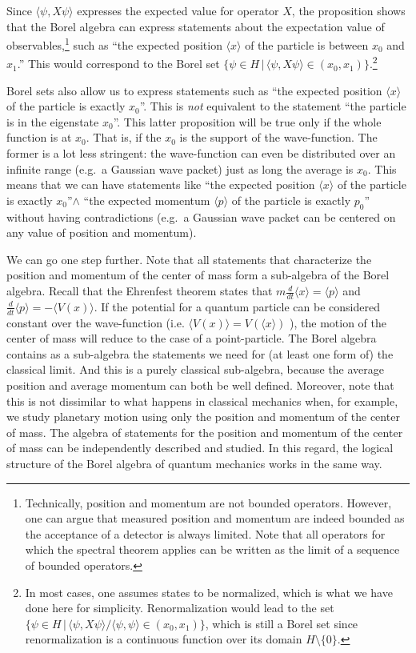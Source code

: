 \documentclass[11pt, executivepaper]{article}
\begin{document}
Since $\langle \psi , X \psi \rangle$ expresses the expected value for operator $X$, the proposition shows that the Borel algebra can express statements about the expectation value of observables,\footnote{Technically, position and momentum are not bounded operators. However, one can argue that measured position and momentum are indeed bounded as the acceptance of a detector is always limited. Note that all operators for which the spectral theorem applies can be written as the limit of a sequence of bounded operators.} such as ``the expected position $\langle x \rangle$ of the particle is between $x_0$ and $x_1$.'' This would correspond to the Borel set $\{ \psi \in H \, | \, \langle \psi , X \psi \rangle \in (x_0, x_1) \}$.\footnote{In most cases, one assumes states to be normalized, which is what we have done here for simplicity. Renormalization would lead to the set $\{ \psi \in H \, | \, \langle \psi , X \psi \rangle / \langle \psi , \psi \rangle \in (x_0, x_1) \}$, which is still a Borel set since renormalization is a continuous function over its domain $H \setminus \{ 0 \}$.}

Borel sets also allow us to express statements such as ``the expected position $\langle x \rangle$ of the particle is exactly $x_0$''. This is \emph{not} equivalent to the statement ``the particle is in the eigenstate $x_0$''. This latter proposition will be true only if the whole function is at $x_0$. That is, if the $x_0$ is the support of the wave-function. The former is a lot less stringent: the wave-function can even be distributed over an infinite range (e.g.\ a Gaussian wave packet) just as long the average is $x_0$. This means that we can have statements like ``the expected position $\langle x \rangle$ of the particle is exactly $x_0$''$\wedge$ ``the expected momentum $\langle p \rangle$ of the particle is exactly $p_0$'' without having contradictions (e.g.\ a Gaussian wave packet can be centered on any value of position and momentum).

We can go one step further. Note that all statements that characterize the position and momentum of the center of mass form a sub-algebra of the Borel algebra. Recall that the Ehrenfest theorem states that $m \frac{d}{dt}\langle x \rangle = \langle p \rangle$ and $ \frac{d}{dt}\langle p \rangle = - \langle V(x) \rangle$. If the potential for a quantum particle can be considered constant over the wave-function (i.e. $\langle V(x) \rangle = V(\langle x \rangle)$ ), the motion of the center of mass will reduce to the case of a point-particle. The Borel algebra contains as a sub-algebra the statements we need for (at least one form of) the classical limit. And this is a purely classical sub-algebra, because the average position and average momentum can both be well defined. Moreover, note that this is not dissimilar to what happens in classical mechanics when, for example, we study planetary motion using only the position and momentum of the center of mass. The algebra of statements for the position and momentum of the center of mass can be independently described and studied. In this regard, the logical structure of the Borel algebra of quantum mechanics works in the same way.
\end{document}
